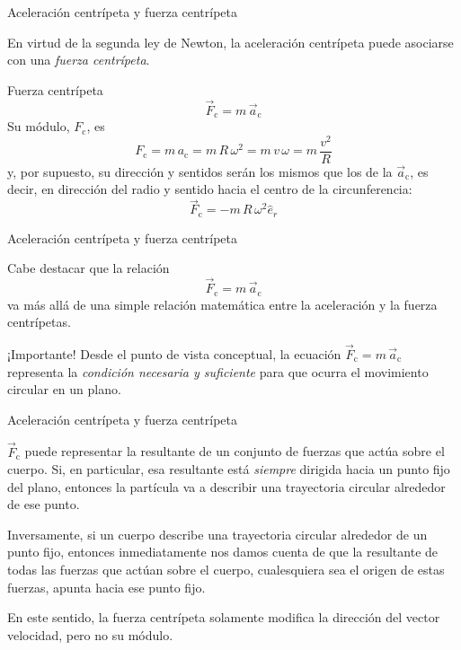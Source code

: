 \documentclass[11pt,handout,aspectratio=1610]{beamer}
\begin{document}
\begin{frame}{Aceleración centrípeta y fuerza centrípeta}

    En virtud de la segunda ley de Newton, la aceleración centrípeta puede asociarse con una \emph{fuerza centrípeta}.

    \begin{block}{Fuerza centrípeta}
    $$\vec{F}_{\text{c}} = m \, \vec{a}_{\text{c}}$$ Su módulo, $F_\text{c}$, es $$F_{\text{c}} = m \, a_{\text{c}} = m \, R \, \omega^2 = m \, v \, \omega = m \, \frac{v^2}{R}$$ y, por supuesto, su dirección y sentidos serán los mismos que los de la $\vec{a}_{\text{c}}$, es decir, en dirección del radio y sentido hacia el centro de la circunferencia: $$ \vec{F}_\text{c} = - m \, R \, \omega^2 \hat{e}_r$$
    \end{block}

\end{frame}

\begin{frame}{Aceleración centrípeta y fuerza centrípeta}

    Cabe destacar que la relación $$\vec{F}_{\text{c}} = m \, \vec{a}_{\text{c}}$$ va más allá de una simple relación matemática entre la aceleración y la fuerza centrípetas.

    \vspace{11pt}

    \begin{alertblock}{¡Importante!}
        Desde el punto de vista conceptual, la ecuación $\vec{F}_{\text{c}} = m \, \vec{a}_{\text{c}}$ representa la \emph{condición necesaria y suficiente} para que ocurra el movimiento circular en un plano.
    \end{alertblock}

\end{frame}

\begin{frame}{Aceleración centrípeta y fuerza centrípeta}

    $\vec{F}_\text{c}$ puede representar la resultante de un conjunto de fuerzas que actúa sobre el cuerpo. Si, en particular, esa resultante está \emph{siempre} dirigida hacia un punto fijo del plano, entonces la partícula va a describir una trayectoria circular alrededor de ese punto. 
    
    \vspace{11pt}
    
    Inversamente, si un cuerpo describe una trayectoria circular alrededor de un punto fijo, entonces inmediatamente nos damos cuenta de que la resultante de todas las fuerzas que actúan sobre el cuerpo, cualesquiera sea el origen de estas fuerzas, apunta hacia ese punto fijo.

    \vspace{11pt}

    En este sentido, la fuerza centrípeta solamente modifica la dirección del vector velocidad, pero no su módulo.

\end{frame}
\end{document}
